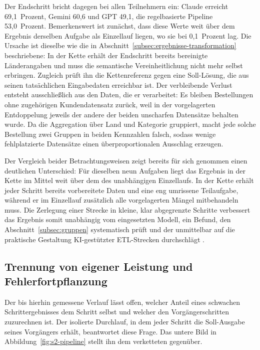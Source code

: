 Der Endschritt bricht dagegen bei allen Teilnehmern ein: Claude erreicht 69,1~Prozent, Gemini 60,6 und GPT 49,1, die regelbasierte Pipeline 53,0~Prozent. Bemerkenswert ist zunächst, dass diese Werte weit über dem Ergebnis derselben Aufgabe als Einzellauf liegen, wo sie bei 0,1~Prozent lag. Die Ursache ist dieselbe wie die in Abschnitt~\ref{subsec:ergebnisse-transformation} beschriebene: In der Kette erhält der Endschritt bereits bereinigte Länderangaben und muss die semantische Vereinheitlichung nicht mehr selbst erbringen. Zugleich prüft ihn die Kettenreferenz gegen eine Soll-Lösung, die aus seinen tatsächlichen Eingabedaten erreichbar ist. Der verbleibende Verlust entsteht ausschließlich aus den Daten, die er verarbeitet: Es bleiben Bestellungen ohne zugehörigen Kundendatensatz zurück, weil in der vorgelagerten Entdoppelung jeweils der andere der beiden unscharfen Datensätze behalten wurde. Da die Aggregation über Land und Kategorie gruppiert, macht jede solche Bestellung zwei Gruppen in beiden Kennzahlen falsch, sodass wenige fehlplatzierte Datensätze einen überproportionalen Ausschlag erzeugen.

Der Vergleich beider Betrachtungsweisen zeigt bereits für sich genommen einen deutlichen Unterschied: Für dieselben neun Aufgaben liegt das Ergebnis in der Kette im Mittel weit über dem des unabhängigen Einzellaufs. In der Kette erhält jeder Schritt bereits vorbereitete Daten und eine eng umrissene Teilaufgabe, während er im Einzellauf zusätzlich alle vorgelagerten Mängel mitbehandeln muss. Die Zerlegung einer Strecke in kleine, klar abgegrenzte Schritte verbessert das Ergebnis somit unabhängig vom eingesetzten Modell, ein Befund, den Abschnitt~\ref{subsec:gruppen} systematisch prüft und der unmittelbar auf die praktische Gestaltung \ac{KI}-gestützter \ac{ETL}-Strecken durchschlägt \autocite{khanOverviewETLTechniques2024,nagabhyruBridgingTraditionalETL2022}.

\subsection{Trennung von eigener Leistung und Fehlerfortpflanzung}
\label{subsec:pipeline-fortpflanzung}

Der bis hierhin gemessene Verlauf lässt offen, welcher Anteil eines schwachen Schrittergebnisses dem Schritt selbst und welcher den Vorgängerschritten zuzurechnen ist. Der isolierte Durchlauf, in dem jeder Schritt die Soll-Ausgabe seines Vorgängers erhält, beantwortet diese Frage. Das untere Bild in Abbildung~\ref{fig:s2-pipeline} stellt ihn dem verketteten gegenüber.

